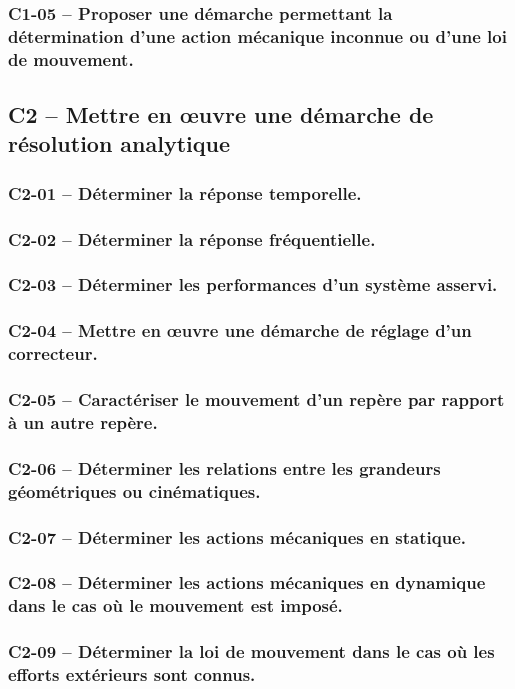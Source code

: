 \subsubsection*{C1-05 -- Proposer une démarche permettant la détermination d’une action mécanique inconnue ou d'une loi de mouvement.}  
\subsection{C2 -- Mettre en œuvre une démarche de résolution analytique}  
\subsubsection*{C2-01 -- Déterminer la réponse temporelle.}  
\subsubsection*{C2-02 -- Déterminer la réponse fréquentielle. }  
\subsubsection*{C2-03 -- Déterminer les performances d'un système asservi.}  
\subsubsection*{C2-04 -- Mettre en œuvre une démarche de réglage d’un correcteur.}  
\subsubsection*{C2-05 -- Caractériser le mouvement d’un repère par rapport à un autre repère.}  
\subsubsection*{C2-06 -- Déterminer les relations entre les grandeurs géométriques ou cinématiques. }  
\subsubsection*{C2-07 -- Déterminer les actions mécaniques en statique.}  
\subsubsection*{C2-08 -- Déterminer les actions mécaniques en dynamique dans le cas où le mouvement est imposé.}  
\subsubsection*{C2-09 -- Déterminer la loi de mouvement dans le cas où les efforts extérieurs sont connus.}  
